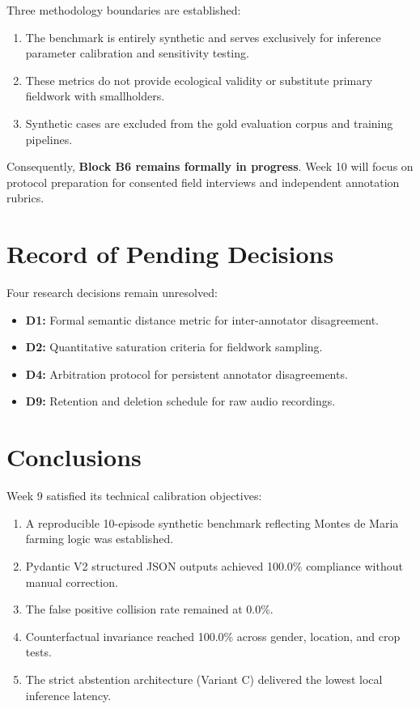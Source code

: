 \documentclass[11pt,a4paper]{article}
\begin{document}
Three methodology boundaries are established:
\begin{enumerate}[itemsep=2pt]
    \item The benchmark is entirely synthetic and serves exclusively for inference parameter calibration and sensitivity testing.
    \item These metrics do not provide ecological validity or substitute primary fieldwork with smallholders.
    \item Synthetic cases are excluded from the gold evaluation corpus and training pipelines.
\end{enumerate}

Consequently, \textbf{Block B6 remains formally in progress}. Week 10 will focus on protocol preparation for consented field interviews and independent annotation rubrics.

\section{Record of Pending Decisions}

Four research decisions remain unresolved:
\begin{itemize}[itemsep=2pt]
    \item \textbf{D1:} Formal semantic distance metric for inter-annotator disagreement.
    \item \textbf{D2:} Quantitative saturation criteria for fieldwork sampling.
    \item \textbf{D4:} Arbitration protocol for persistent annotator disagreements.
    \item \textbf{D9:} Retention and deletion schedule for raw audio recordings.
\end{itemize}

\section{Conclusions}

Week 9 satisfied its technical calibration objectives:
\begin{enumerate}[itemsep=2pt]
    \item A reproducible 10-episode synthetic benchmark reflecting Montes de Maria farming logic was established.
    \item Pydantic V2 structured JSON outputs achieved 100.0\% compliance without manual correction.
    \item The false positive collision rate remained at 0.0\%.
    \item Counterfactual invariance reached 100.0\% across gender, location, and crop tests.
    \item The strict abstention architecture (Variant C) delivered the lowest local inference latency.
\end{enumerate}
\end{document}
